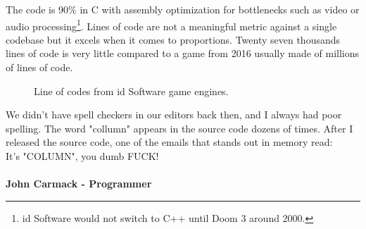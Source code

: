 \documentclass[book.tex]{subfiles}
\begin{document}
\par
 The code is 90\% in C with assembly optimization for bottlenecks such as video or audio processing\footnote{id Software would not switch to C++ until Doom 3 around 2000.}. Lines of code are not a meaningful metric against a single codebase but it excels when it comes to proportions. Twenty seven thousands lines of code is very little compared to a game from 2016 usually made of millions of lines of code.\\
\par
\begin{figure}[H]
\centering
   \caption{Line of codes from id Software game engines.}
 \end{figure}
 
\par

 \begin{fancyquotes}
   We didn't have spell checkers in our editors back then, and I always had poor spelling.  The word "collumn" appears in the source code dozens of times.  After I released the source code, one of the emails that stands out in memory read:
 \bigskip \\
It's "COLUMN", you dumb FUCK!\\
 \bigskip \\
\textbf{John Carmack - Programmer}
 \end{fancyquotes}
 
\end{document}
